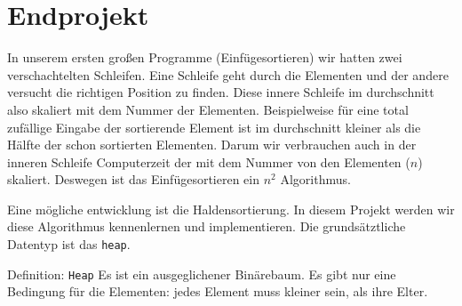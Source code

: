 \section{Endprojekt}


In unserem ersten großen Programme (Einfügesortieren) wir hatten
zwei verschachtelten Schleifen. Eine Schleife geht durch die Elementen
und der andere versucht die richtigen Position zu finden. Diese
innere Schleife im durchschnitt also skaliert mit dem Nummer der Elementen.
Beispielweise für eine total zufällige Eingabe der sortierende Element ist im 
durchschnitt kleiner als die Hälfte der schon sortierten Elementen. Darum 
wir verbrauchen  auch in der inneren Schleife Computerzeit der mit 
dem Nummer von den Elementen ($n$) skaliert. Deswegen ist das Einfügesortieren
ein $n^2$ Algorithmus.

Eine mögliche entwicklung ist die Haldensortierung. In diesem Projekt werden wir 
diese Algorithmus kennenlernen und implementieren. Die grundsätztliche Datentyp ist 
das \texttt{heap}.

\begin{myexampleblock}{Definition: \texttt{Heap}}
Es ist ein ausgeglichener Binärebaum. Es gibt nur eine Bedingung für die Elementen:
jedes Element muss kleiner sein, als ihre Elter.
\end{myexampleblock} 

